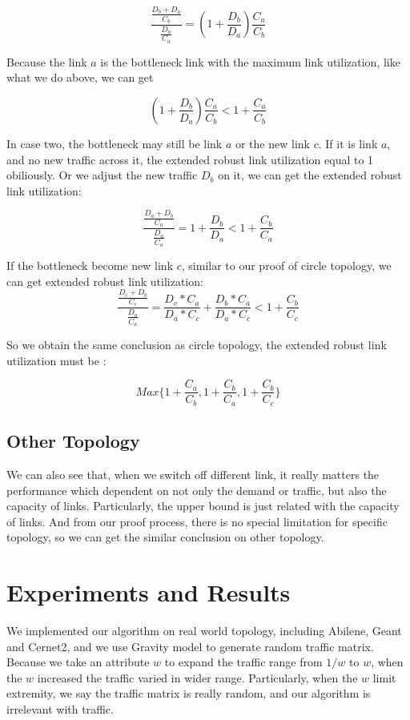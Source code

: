 \documentclass[conference]{IEEEtran}
\begin{document}
\begin{equation}
    \frac {\frac{D_b + D_a}{C_b}}{\frac{D_a}{C_a}} = (1+\frac{D_b}{D_a}) \frac{C_a}{C_b}
\end{equation}

Because the link $a$ is the bottleneck link with the maximum link utilization, like what we do above, we can get 

\begin{equation}
    (1+\frac{D_b}{D_a}) \frac{C_a}{C_b} < 1 + \frac{C_a}{C_b}
\end{equation}

In case two, the bottleneck may still be link $a$ or the new link $c$. If it is link $a$, and no new traffic across it,
the extended robust link utilization equal to 1 obiliously. Or we adjust the new traffic $D_b$ on it, we can get the
extended robust link utilization:

\begin{equation}
    \frac{\frac{D_a + D_b}{C_a}}{\frac{D_a}{C_a}} = 1 + \frac{D_b}{D_a} < 1 + \frac{C_b}{C_a}
\end{equation}

If the bottleneck become new link $c$, similar to our proof of circle topology, we can get extended robust link utilization:
\begin{equation}
    \frac{\frac{D_c + D_b}{C_c}}{\frac{D_a}{C_a}} = \frac{D_c * C_a}{D_a * C_c} + \frac{D_b * C_a}{D_a * C_c} < 1 + \frac{C_b}{C_c}
\end{equation}

So we obtain the same conclusion as circle topology, the extended robust link utilization must be :

\begin{equation}
    Max\{1 + \frac{C_a}{C_b}, 1 + \frac{C_b}{C_a}, 1 + \frac{C_b}{C_c}\}
\end{equation}

\subsection{Other Topology}
We can also see that, when we switch off different link, it really matters the performance which dependent on not only the 
demand or traffic, but also the capacity of links. Particularly, the upper bound is just related with the capacity of links.
And from our proof process, there is no special limitation for specific topology, so we can get the similar conclusion 
on other topology.


\section{Experiments and Results}
We implemented our algorithm on real world topology, including Abilene, Geant and Cernet2, and we use Gravity model to generate
random traffic matrix. Because we take an attribute $w$ to expand the traffic range from $1/w$ to $w$, when the $w$ increased the
traffic varied in wider range. Particularly, when the $w$ limit extremity, we say the traffic matrix is really random, and our 
algorithm is irrelevant with traffic.
\end{document}
